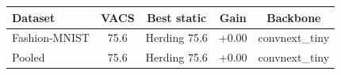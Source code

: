 \begin{tabular}{lcccc}
\toprule
Dataset & VACS & Best static & Gain & Backbone \\
\midrule
Fashion-MNIST & 75.6 & Herding 75.6 & +0.00 & convnext_tiny \\
Pooled & 75.6 & Herding 75.6 & +0.00 & convnext_tiny \\
\bottomrule
\end{tabular}
